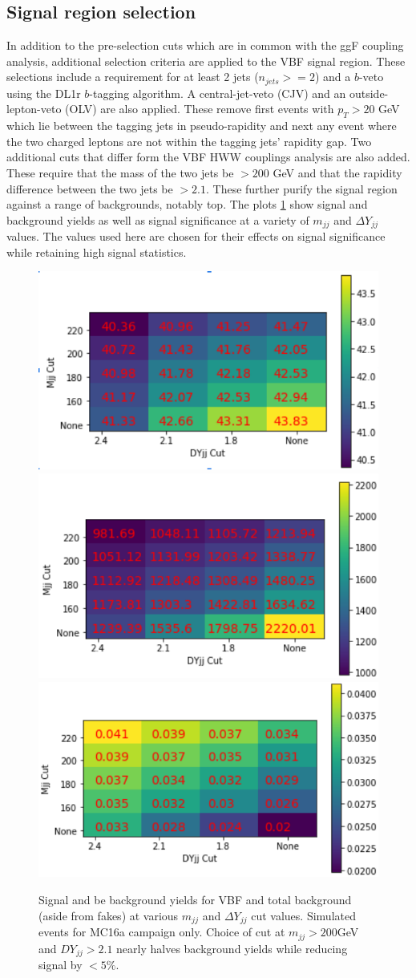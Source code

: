 \subsection{Signal region selection}
In addition to the pre-selection cuts which are in common with the ggF coupling analysis, additional selection criteria are applied to the VBF signal region. These selections include a requirement for at least 2 jets ($n_{jets}>=2$) and a $b$-veto using the DL1r $b$-tagging algorithm. A central-jet-veto (CJV) and an outside-lepton-veto (OLV) are also applied. These remove first events with $p_T >20$ GeV which lie between the tagging jets in pseudo-rapidity and next any event where the two charged leptons are not within the tagging jets' rapidity gap. Two additional cuts that differ form the VBF HWW couplings analysis are also added. These require that the mass of the two jets be $>200$ GeV and that the rapidity difference between the two jets be $>2.1$. These further purify the signal region against a range of backgrounds, notably top. The plots \ref{fig:MjjDYjjSig} show signal and background yields as well as signal significance at a variety of $m_{jj}$ and $\Delta Y_{jj}$ values. The values used here are chosen for their effects on signal significance while retaining high signal statistics. 

\begin{figure}[!htbp]
\centering
\includegraphics[width=.3\linewidth]{Pictures/MjjDYjjVBF.png}
\includegraphics[width=.3\linewidth]{Pictures/MjjDYjjBackground.png}
\includegraphics[width=.3\linewidth]{Pictures/MjjDYjjSig.png}
\caption{Signal and be background yields for VBF and total background (aside from fakes) at various $m_{jj}$ and $\Delta Y_{jj}$ cut values. Simulated events for MC16a campaign only. Choice of cut at $m_{jj}>200$GeV and $DY_{jj}>2.1$ nearly halves background yields while reducing signal by $<5\%$.}
\label{fig:MjjDYjjSig}
\end{figure}


